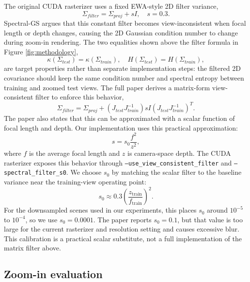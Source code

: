 \documentclass{article}
\begin{document}
The original CUDA rasterizer uses a fixed EWA-style 2D filter variance,
\begin{equation}
    \Sigma_{filter}=\Sigma_{proj}+sI,\quad s=0.3.
\end{equation}
Spectral-GS argues that this constant filter becomes view-inconsistent when focal length or depth changes, causing the 2D Gaussian condition number to change during zoom-in rendering. The two equalities shown above the filter formula in Figure \ref{fig:methodology},
\begin{equation}
    \kappa(\Sigma_{test})=\kappa(\Sigma_{train}), \quad H(\Sigma_{test})=H(\Sigma_{train}),
\end{equation}
are target properties rather than separate implementation steps: the filtered 2D covariance should keep the same condition number and spectral entropy between training and zoomed test views. The full paper derives a matrix-form view-consistent filter to enforce this behavior,
\begin{equation}
    \Sigma_{filter}=\Sigma_{proj}+(J_{test}J_{train}^{-1})sI(J_{test}J_{train}^{-1})^T.
\end{equation}
The paper also states that this can be approximated with a scalar function of focal length and depth. Our implementation uses this practical approximation:
\begin{equation}
    s=s_0\frac{f^2}{z^2},
\end{equation}
where $f$ is the average focal length and $z$ is camera-space depth. The CUDA rasterizer exposes this behavior through \texttt{--use\_view\_consistent\_filter} and \texttt{--spectral\_filter\_s0}. We choose $s_0$ by matching the scalar filter to the baseline variance near the training-view operating point:
\begin{equation}
    s_0 \approx 0.3\left(\frac{z_{\mathrm{train}}}{f_{\mathrm{train}}}\right)^2.
\end{equation}
For the downsampled scenes used in our experiments, this places $s_0$ around $10^{-5}$ to $10^{-4}$, so we use $s_0=0.0001$. The paper reports $s_0=0.1$, but that value is too large for the current rasterizer and resolution setting and causes excessive blur. This calibration is a practical scalar substitute, not a full implementation of the matrix filter above.

\subsection{Zoom-in evaluation}
\end{document}
